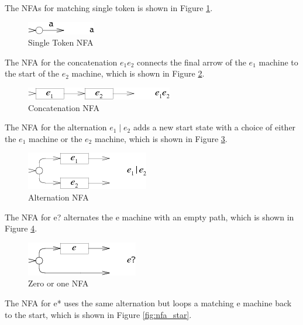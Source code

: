 The NFAs for matching single token is shown in Figure \ref{fig:nfa_single}.

\begin{figure}[htbp]
  \centering
  \includegraphics[scale=1]{images/single_token.png}
  \caption{Single Token NFA}
  \label{fig:nfa_single}
\end{figure}

The NFA for the concatenation $e_1e_2$ connects the final arrow of the $e_1$ machine to the start of the $e_2$ machine, which is shown in Figure \ref{fig:nfa_cocat}.

\begin{figure}[htbp]
  \centering
  \includegraphics[scale=1]{images/concatenation_tokens.png}
  \caption{Concatenation NFA}
  \label{fig:nfa_cocat}
\end{figure}

The NFA for the alternation $e_1\mid e_2$ adds a new start state with a choice of either the $e_1$ machine or the $e_2$ machine, which is shown in Figure \ref{fig:nfa_alternation}.


\begin{figure}[htbp]
  \centering
  \includegraphics[scale=1]{images/alternation.png}
  \caption{Alternation NFA}
  \label{fig:nfa_alternation}
\end{figure}

The NFA for e? alternates the e machine with an empty path, which is shown in Figure \ref{fig:nfa_question}.


\begin{figure}[htbp]
  \centering
  \includegraphics[scale=1]{images/question.png}
  \caption{Zero or one NFA}
  \label{fig:nfa_question}
\end{figure}

The NFA for e* uses the same alternation but loops a matching e machine back to the start, which is shown in Figure \ref{fig:nfa_star}.

